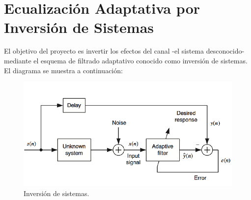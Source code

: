 \section{Ecualización Adaptativa por Inversión de Sistemas}

El objetivo del proyecto es invertir los efectos del canal 
-el sistema desconocido- mediante el esquema de filtrado
adaptativo conocido como inversión de sistemas. El diagrama se muestra 
a continuación:

\begin{figure}[h]
    \centering
    \includegraphics[scale=0.5]{imagenes/block.PNG}
    \caption{Inversión de sistemas.}
\end{figure}

